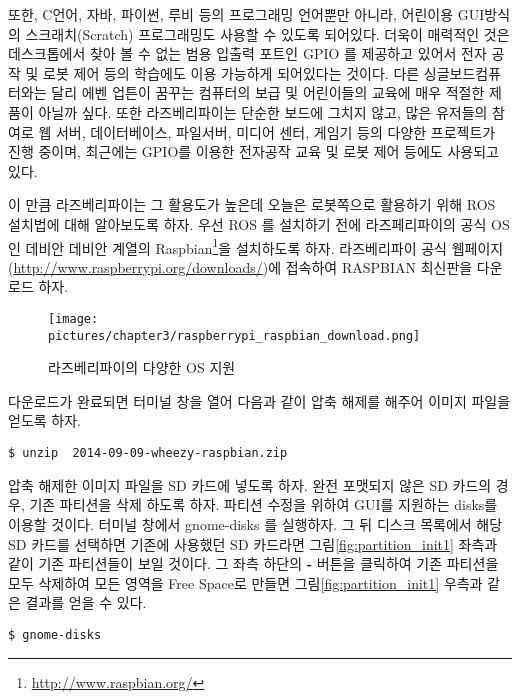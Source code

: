 또한, C언어, 자바, 파이썬, 루비 등의 프로그래밍 언어뿐만 아니라, 어린이용 GUI방식의 스크래치(Scratch) 프로그래밍도 사용할 수 있도록 되어있다. 더욱이 매력적인 것은 데스크톱에서 찾아 볼 수 없는 범용 입출력 포트인 GPIO 를 제공하고 있어서 전자 공작 및 로봇 제어 등의 학습에도 이용 가능하게 되어있다는 것이다. 다른 싱글보드컴퓨터와는 달리 에벤 업튼이 꿈꾸는 컴퓨터의 보급 및 어린이들의 교육에 매우 적절한 제품이 아닐까 싶다. 또한 라즈베리파이는 단순한 보드에 그치지 않고, 많은 유저들의 참여로 웹 서버, 데이터베이스, 파일서버, 미디어 센터, 게임기 등의 다양한 프로젝트가 진행 중이며, 최근에는 GPIO를 이용한 전자공작 교육 및 로봇 제어 등에도 사용되고 있다\cite{lp2013raspberry}.

이 만큼 라즈베리파이는 그 활용도가 높은데 오늘은 로봇쪽으로 활용하기 위해 ROS 설치법에 대해 알아보도록 하자. 우선 ROS 를 설치하기 전에 라즈페리파이의 공식 OS인 데비안 데비안 계열의 Raspbian\footnote{\url{http://www.raspbian.org/}}을 설치하도록 하자. 라즈베리파이 공식 웹페이지(\url{http://www.raspberrypi.org/downloads/})에 접속하여 RASPBIAN 최신판을 다운로드 하자.

\begin{figure}[h]
\centering\texttt{[image: pictures/chapter3/raspberrypi\_raspbian\_download.png]}
\caption{라즈베리파이의 다양한 OS 지원}
\end{figure}

\newpage

\noindent
다운로드가 완료되면 터미널 창을 열어 다음과 같이 압축 해제를 해주어 이미지 파일을 얻도록 하자.

\vspace{\baselineskip}
\begin{lstlisting}[language=ROS]
$ unzip  2014-09-09-wheezy-raspbian.zip
\end{lstlisting}

\noindent
압축 해제한 이미지 파일을 SD 카드에 넣도록 하자. 완전 포맷되지 않은 SD 카드의 경우, 기존 파티션을 삭제 하도록 하자. 파티션 수정을 위하여 GUI를 지원하는 disks를 이용할 것이다. 터미널 창에서 gnome-disks 를 실행하자. 그 뒤 디스크 목록에서 해당 SD 카드를 선택하면 기존에 사용했던 SD 카드라면 그림\ref{fig:partition_init1} 좌측과 같이 기존 파티션들이 보일 것이다. 그 좌측 하단의 \textbf{-} 버튼을 클릭하여 기존 파티션을 모두 삭제하여 모든 영역을 Free Space로 만들면 그림\ref{fig:partition_init1} 우측과 같은 결과를 얻을 수 있다.

\vspace{\baselineskip}
\begin{lstlisting}[language=ROS]
$ gnome-disks
\end{lstlisting}

